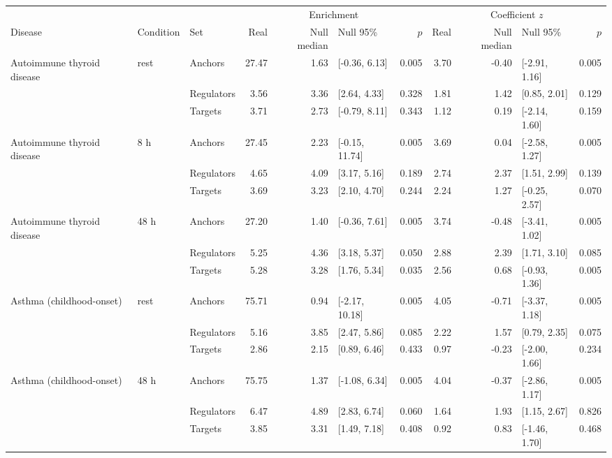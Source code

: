 \begin{tabular}{lllrrlrrrlr}
\toprule
 & & & \multicolumn{4}{c}{Enrichment} & \multicolumn{4}{c}{Coefficient $z$} \\
\cmidrule(lr){4-7}\cmidrule(lr){8-11}
Disease & Condition & Set & Real & Null median & Null 95\% & $p$ & Real & Null median & Null 95\% & $p$ \\
\midrule
Autoimmune thyroid disease & rest & Anchors & 27.47 & 1.63 & [-0.36, 6.13] & 0.005 & 3.70 & -0.40 & [-2.91, 1.16] & 0.005 \\
 &  & Regulators & 3.56 & 3.36 & [2.64, 4.33] & 0.328 & 1.81 & 1.42 & [0.85, 2.01] & 0.129 \\
 &  & Targets & 3.71 & 2.73 & [-0.79, 8.11] & 0.343 & 1.12 & 0.19 & [-2.14, 1.60] & 0.159 \\
\addlinespace
Autoimmune thyroid disease & 8 h & Anchors & 27.45 & 2.23 & [-0.15, 11.74] & 0.005 & 3.69 & 0.04 & [-2.58, 1.27] & 0.005 \\
 &  & Regulators & 4.65 & 4.09 & [3.17, 5.16] & 0.189 & 2.74 & 2.37 & [1.51, 2.99] & 0.139 \\
 &  & Targets & 3.69 & 3.23 & [2.10, 4.70] & 0.244 & 2.24 & 1.27 & [-0.25, 2.57] & 0.070 \\
\addlinespace
Autoimmune thyroid disease & 48 h & Anchors & 27.20 & 1.40 & [-0.36, 7.61] & 0.005 & 3.74 & -0.48 & [-3.41, 1.02] & 0.005 \\
 &  & Regulators & 5.25 & 4.36 & [3.18, 5.37] & 0.050 & 2.88 & 2.39 & [1.71, 3.10] & 0.085 \\
 &  & Targets & 5.28 & 3.28 & [1.76, 5.34] & 0.035 & 2.56 & 0.68 & [-0.93, 1.36] & 0.005 \\
\addlinespace
Asthma (childhood-onset) & rest & Anchors & 75.71 & 0.94 & [-2.17, 10.18] & 0.005 & 4.05 & -0.71 & [-3.37, 1.18] & 0.005 \\
 &  & Regulators & 5.16 & 3.85 & [2.47, 5.86] & 0.085 & 2.22 & 1.57 & [0.79, 2.35] & 0.075 \\
 &  & Targets & 2.86 & 2.15 & [0.89, 6.46] & 0.433 & 0.97 & -0.23 & [-2.00, 1.66] & 0.234 \\
\addlinespace
Asthma (childhood-onset) & 48 h & Anchors & 75.75 & 1.37 & [-1.08, 6.34] & 0.005 & 4.04 & -0.37 & [-2.86, 1.17] & 0.005 \\
 &  & Regulators & 6.47 & 4.89 & [2.83, 6.74] & 0.060 & 1.64 & 1.93 & [1.15, 2.67] & 0.826 \\
 &  & Targets & 3.85 & 3.31 & [1.49, 7.18] & 0.408 & 0.92 & 0.83 & [-1.46, 1.70] & 0.468 \\
\bottomrule
\end{tabular}
